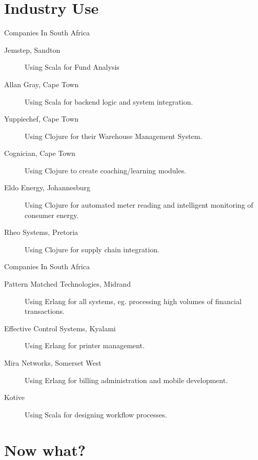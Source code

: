 \documentclass[mathserif]{beamer}
\begin{document}
\section{Industry Use}

\begin{frame}{Companies In South Africa}

  \begin{description}
  \item[Jemstep, Sandton] Using Scala for Fund Analysis
  \item[Allan Gray, Cape Town] Using Scala for backend logic and system integration.
  \item[Yuppiechef, Cape Town] Using Clojure for their Warehouse
    Management System.
  \item[Cognician, Cape Town] Using Clojure to create coaching/learning modules.
  \item[Eldo Energy, Johannesburg] Using Clojure for automated meter
    reading and intelligent monitoring of consumer energy.
  \item[Rheo Systems, Pretoria] Using Clojure for supply chain integration.
  \end{description}

\end{frame}

\begin{frame}{Companies In South Africa}

  \begin{description}
  \item[Pattern Matched Technologies, Midrand] Using Erlang for all systems,
    eg. processing high volumes of financial transactions.
  \item[Effective Control Systems, Kyalami] Using Erlang for printer
    management.
  \item[Mira Networks, Somerset West] Using Erlang for billing
    administration and mobile development.
  \item[Kotive] Using Scala for designing workflow processes.
  \end{description}

\end{frame}

\section{Now what?}
\end{document}
